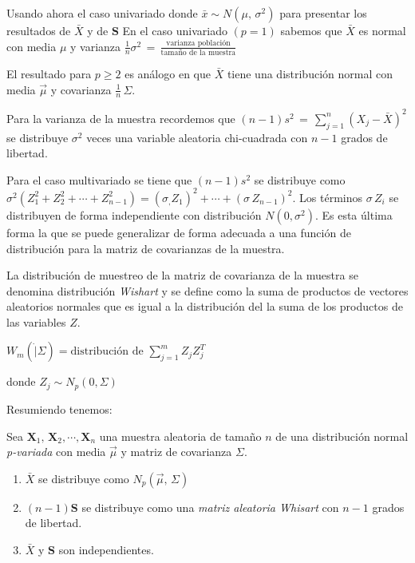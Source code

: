\documentclass[english]{report}
\begin{document}
Usando ahora el caso univariado donde $\bar{x} \sim N(\mu,\,\sigma^2)$ para presentar los resultados de $\bar{X}$ y de $\textbf{S}$
\vspace{5pt}
En el caso univariado $(p=1)$ sabemos que $\bar{X}$ es normal con media $\mu$ y varianza
$\frac{1}{n}\sigma^2\,=\,\frac{\text{varianza población}}{\text{tamaño de la muestra}}$  

\vspace{5pt}
  
El resultado para $p \geq 2$ es análogo en que $\bar{X}$ tiene una distribución normal con media $\vec{\mu}$ y covarianza $\frac{1}{n}\,\Sigma$.

Para la varianza de la muestra recordemos que $(n-1)s^2\,=\,\sum_{j=1}^n(X_j-\bar{X})^2$ se distribuye $\sigma^2$ veces una variable aleatoria chi-cuadrada con $n-1$ grados de libertad.

Para el caso multivariado se tiene que $(n-1)s^2$ se distribuye como $\sigma^2(Z^2_1+Z^2_2+\cdots+Z^2_{n-1})=(\sigma_,Z_1)^2+\cdots+(\sigma\,Z_{n-1})^2$. Los términos $\sigma\,Z_i$ se distribuyen de forma independiente con distribución $N(0,\sigma^2)$. Es esta última forma la que se puede generalizar de forma adecuada a una función de distribución para la matriz de covarianzas de la muestra.


La distribución de muestreo de la matriz de covarianza de la muestra se denomina distribución \emph{Wishart} y se define como la suma de productos de vectores aleatorios normales que es igual a la distribución del la suma de los productos de las variables $Z$. 

\vspace{5pt}
$W_m(\dot|\Sigma)= \text{distribución de   } \sum_{j=1}^m Z_jZ_j^T$

donde $Z_j \sim N_p(0,\Sigma)$ 

Resumiendo tenemos:

Sea $\textbf{X}_1,\,\textbf{X}_2,\cdots,\textbf{X}_n$ una muestra aleatoria de tamaño $n$ de una distribución normal \emph{p-variada} con media $\vec{\mu}$ y matriz de covarianza $\Sigma$.

\begin{enumerate}
\item $\bar{X}$ se distribuye como $N_p(\vec{\mu},\,\Sigma)$
\item $(n-1)\textbf{S}$ se distribuye como una \emph{matriz aleatoria Whisart} con $n-1$ grados de libertad.
\item $\bar{X}$ y $\textbf{S}$ son independientes.
\end{enumerate}
\end{document}
